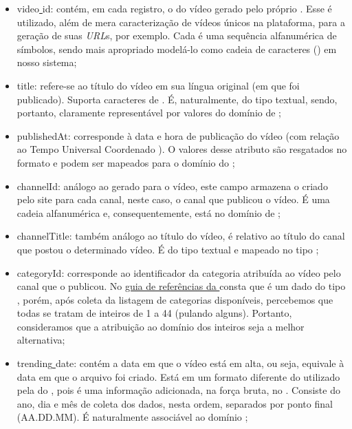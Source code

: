 \begin{enumerate}
  \begin{itemize}
    \item video\underline{ }id: contém, em cada registro, o  do vídeo gerado pelo próprio . Esse  é utilizado, além de mera caracterização de vídeos únicos na plataforma, para a geração de suas \textit{URL}s, por exemplo. Cada  é uma sequência alfanumérica de símbolos, sendo mais apropriado modelá-lo como cadeia de caracteres () em nosso sistema;
    \item title: refere-se ao título do vídeo em sua língua original (em que foi publicado). Suporta caracteres de . É, naturalmente, do tipo textual, sendo, portanto, claramente representável por valores do domínio de ; 
    \item publishedAt: corresponde à data e hora de publicação do vídeo (com relação ao Tempo Universal Coordenado ). O valores desse atributo são resgatados no formato \href{https://www.w3.org/TR/NOTE-datetime}{} e podem ser mapeados para o domínio  do ;
    \item channelId: análogo ao  gerado para o vídeo, este campo armazena o  criado pelo site para cada canal, neste caso, o canal que publicou o vídeo. É uma cadeia alfanumérica e, consequentemente, está no domínio de ; 
    \item channelTitle: também análogo ao título do vídeo, é relativo ao título do canal que postou o determinado vídeo. É do tipo textual e mapeado no tipo ;
    \item categoryId: corresponde ao identificador da categoria atribuída ao vídeo pelo canal que o publicou. No \href{https://developers.google.com/youtube/v3/docs/videos?hl=pt-br#snippet.categoryId}{guia de referências da } consta que é um dado do tipo , porém, após coleta da listagem de categorias disponíveis, percebemos que todas se tratam de inteiros de 1 a 44 (pulando alguns). Portanto, consideramos que a atribuição ao domínio dos inteiros seja a melhor alternativa;
    \item trending\underline{ }date: contém a data em que o vídeo está em alta, ou seja, equivale à data em que o arquivo  foi criado. Está em um formato diferente do utilizado pela  do , pois é uma informação adicionada, na força bruta, no . Consiste do ano, dia e mês de coleta dos dados, nesta ordem, separados por ponto final (AA.DD.MM). É naturalmente associável ao domínio ;

\end{itemize}
\end{enumerate}
